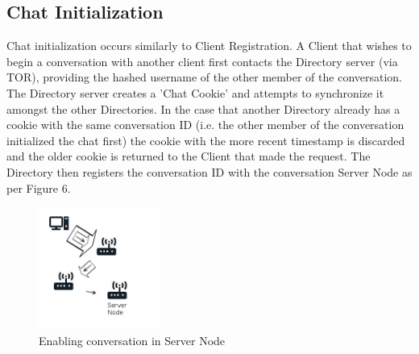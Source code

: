 \documentclass{article}
\begin{document}
\subsection{Chat Initialization}
Chat initialization occurs similarly to Client Registration. A Client that wishes to begin a conversation with another client first contacts the Directory server (via TOR), providing the hashed
username of the other member of the conversation. The Directory server creates a 'Chat Cookie' and attempts to synchronize it amongst the other Directories. In the case that another
Directory already has a cookie with the same conversation ID (i.e. the other member of the conversation initialized the chat first) the cookie with the more recent timestamp is discarded
and the older cookie is returned to the Client that made the request. The Directory then registers the conversation ID with the conversation Server Node as per Figure 6.
\begin{figure}[h]
  	\centering
  	\includegraphics[width=4cm,height=4cm,keepaspectratio]{img/MessageIDRegistration.png}
	\caption{Enabling conversation in Server Node}
\end{figure}
\end{document}

